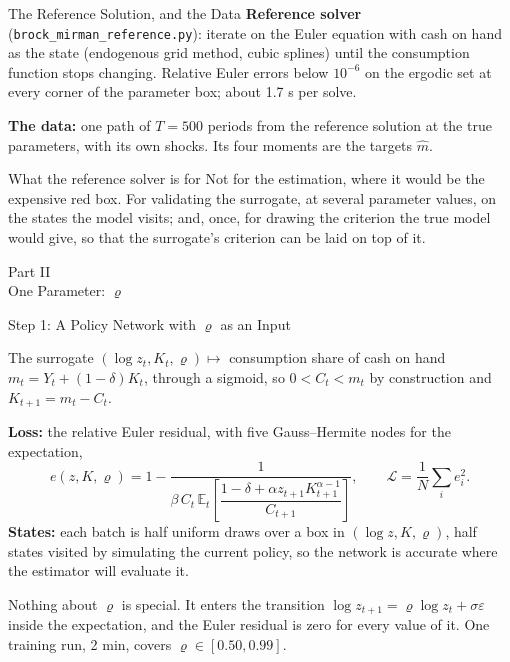 \documentclass[aspectratio=169,11pt]{beamer}
\newcommand{\emphc}[1]{\textcolor{harvardcrimson}{#1}}
\begin{document}
\begin{frame}{The Reference Solution, and the Data}
\small
\textbf{Reference solver} (\texttt{brock\_mirman\_reference.py}): iterate on the Euler equation with cash on hand as the state (endogenous grid method, cubic splines) until the consumption function stops changing. Relative Euler errors below $10^{-6}$ on the ergodic set at every corner of the parameter box; about 1.7 s per solve.

\vspace{0.2cm}
\textbf{The data:} one path of $T = 500$ periods from the reference solution at the true parameters, with its own shocks. Its four moments are the targets $\hat m$.

\vspace{0.2cm}
\begin{block}{What the reference solver is for}
Not for the estimation, where it would be the expensive red box. For \emphc{validating the surrogate}, at several parameter values, on the states the model visits; and, once, for drawing the criterion the true model would give, so that the surrogate's criterion can be laid on top of it.
\end{block}
\end{frame}


\begin{frame}{}
\begin{center}
{\Huge \textcolor{uzhblue}{Part II}}\\[0.8em]
{\LARGE One Parameter: $\varrho$}
\end{center}
\end{frame}

\begin{frame}{Step 1: A Policy Network with $\varrho$ as an Input}
\small
\begin{block}{The surrogate}
$(\log z_t, K_t, \varrho) \mapsto$ consumption share of cash on hand $m_t = Y_t + (1-\delta)K_t$, through a sigmoid, so $0 < C_t < m_t$ by construction and $K_{t+1} = m_t - C_t$.
\end{block}

\vspace{0.1cm}
\textbf{Loss:} the relative Euler residual, with five Gauss--Hermite nodes for the expectation,
\[
e(z, K, \varrho) = 1 - \frac{1}{\beta\, C_t\, \mathbb{E}_t\!\left[\dfrac{1 - \delta + \alpha z_{t+1} K_{t+1}^{\alpha-1}}{C_{t+1}}\right]},
\qquad \mathcal{L} = \frac1N \sum_i e_i^2 .
\]
\textbf{States:} each batch is half uniform draws over a box in $(\log z, K, \varrho)$, half states visited by simulating the current policy, so the network is accurate where the estimator will evaluate it.

\vspace{0.2cm}
\emphc{Nothing about $\varrho$ is special.} It enters the transition $\log z_{t+1} = \varrho \log z_t + \sigma\varepsilon$ inside the expectation, and the Euler residual is zero for every value of it. One training run, 2 min, covers $\varrho \in [0.50, 0.99]$.
\end{frame}
\end{document}
